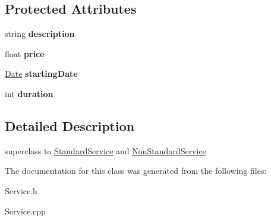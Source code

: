 \subsection*{Protected Attributes}
\begin{DoxyCompactItemize}
\item 
\hypertarget{class_service_a412240629a97315e5005770c0c965d6d}{}string {\bfseries description}\label{class_service_a412240629a97315e5005770c0c965d6d}

\item 
\hypertarget{class_service_a7daf7b57889f8147767ed185468ed202}{}float {\bfseries price}\label{class_service_a7daf7b57889f8147767ed185468ed202}

\item 
\hypertarget{class_service_a7b13f5323bb580051ced9b976c41d3b0}{}\hyperlink{struct_date}{Date} {\bfseries starting\+Date}\label{class_service_a7b13f5323bb580051ced9b976c41d3b0}

\item 
\hypertarget{class_service_a001abaecc2ecdcd962f5687a025f81da}{}int {\bfseries duration}\label{class_service_a001abaecc2ecdcd962f5687a025f81da}

\end{DoxyCompactItemize}


\subsection{Detailed Description}
superclass to \hyperlink{class_standard_service}{Standard\+Service} and \hyperlink{class_non_standard_service}{Non\+Standard\+Service} 

The documentation for this class was generated from the following files\+:\begin{DoxyCompactItemize}
\item 
Service.\+h\item 
Service.\+cpp\end{DoxyCompactItemize}
